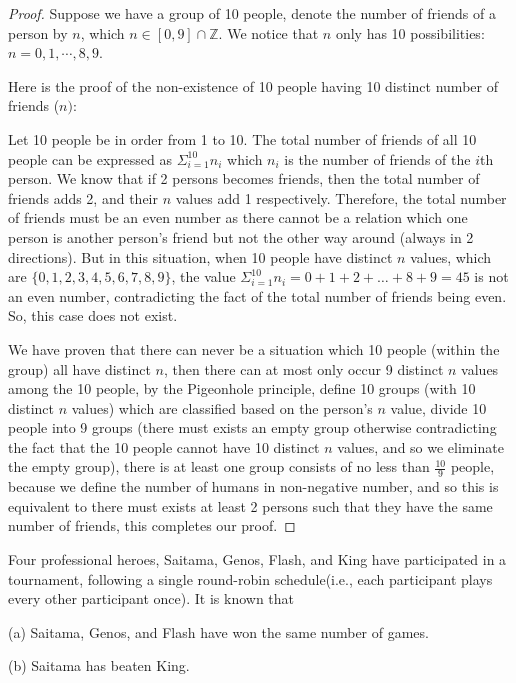 \documentclass{homework}
\theoremstyle{remark}
\newcommand{\?}{\stackrel{?}{=}}
\begin{document}
\begin{proof}
    Suppose we have a group of 10 people, denote the number of friends of a person by $n$, which $n\in[0,9]\cap\mathbb{Z}$. We notice that $n$ only has 10 possibilities: $n=0,1,\cdots,8,9$. 

    Here is the proof of the non-existence of 10 people having 10 distinct number of friends ($n)$:

    Let 10 people be in order from 1 to 10. The total number of friends of all 10 people can be expressed as $\Sigma_{i=1}^{10}n_i$ which $n_i$ is the number of friends of the $i$th person. We know that if 2 persons becomes friends, then the total number of friends adds 2, and their $n$ values add 1 respectively. Therefore, the total number of friends must be an even number as there cannot be a relation which one person is another person's friend but not the other way around (always in 2 directions). But in this situation, when 10 people have distinct $n$ values, which are $\{0,1,2,3,4,5,6,7,8,9\}$, the value $\Sigma_{i=1}^{10}n_i=0+1+2+\ldots+8+9=45$ is not an even number, contradicting the fact of the total number of friends being even. So, this case does not exist. 

    We have proven that there can never be a situation which 10 people (within the group) all have distinct $n$, then there can at most only occur 9 distinct $n$ values among the 10 people, by the Pigeonhole principle, define 10 groups (with 10 distinct $n$ values) which are classified based on the person's $n$ value, divide 10 people into 9 groups (there must exists an empty group otherwise contradicting the fact that the 10 people cannot have 10 distinct $n$ values, and so we eliminate the empty group), there is at least one group consists of no less than $\frac{10}9$ people, because we define the number of humans in non-negative number, and so this is equivalent to there must exists at least 2 persons such that they have the same number of friends, this completes our proof. 
\end{proof}

\newpage

\question Four professional heroes, Saitama, Genos, Flash, and King have participated in a tournament, following a single round-robin schedule(i.e., each participant plays every other participant once). It is known that

(a) Saitama, Genos, and Flash have won the same number of games.

(b) Saitama has beaten King.
\end{document}
